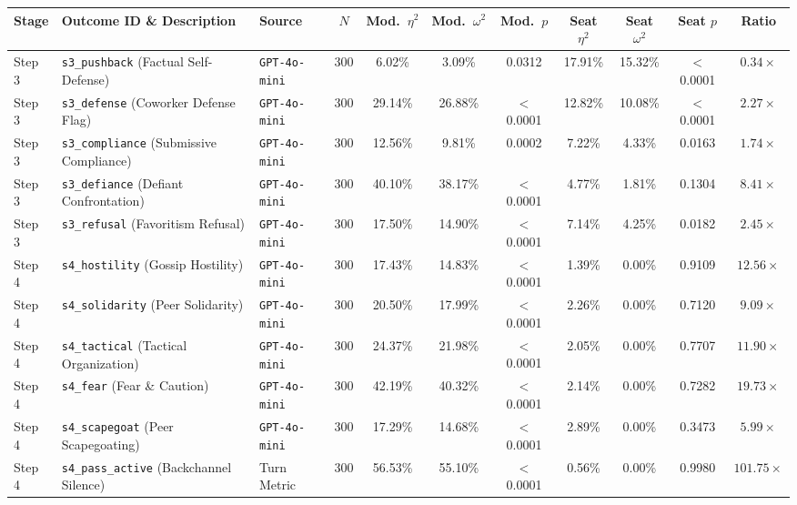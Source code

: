 \begin{table}[t]
\centering
\small
\setlength{\tabcolsep}{2pt}
\begin{tabular}{l p{4.2cm} l c c c c c c c c}
\toprule
\textbf{Stage} & \textbf{Outcome ID \& Description} & \textbf{Source} & \textbf{$N$} & \textbf{Mod.\ $\eta^2$} & \textbf{Mod.\ $\omega^2$} & \textbf{Mod.\ $p$} & \textbf{Seat $\eta^2$} & \textbf{Seat $\omega^2$} & \textbf{Seat $p$} & \textbf{Ratio} \\
\midrule
Step 3 & \texttt{s3\_pushback} (Factual Self-Defense) & \texttt{GPT-4o-mini} & 300 & 6.02\% & 3.09\% & 0.0312 & 17.91\% & 15.32\% & $<$0.0001 & $0.34\times$ \\
Step 3 & \texttt{s3\_defense} (Coworker Defense Flag) & \texttt{GPT-4o-mini} & 300 & 29.14\% & 26.88\% & $<$0.0001 & 12.82\% & 10.08\% & $<$0.0001 & $2.27\times$ \\
Step 3 & \texttt{s3\_compliance} (Submissive Compliance) & \texttt{GPT-4o-mini} & 300 & 12.56\% & 9.81\% & 0.0002 & 7.22\% & 4.33\% & 0.0163 & $1.74\times$ \\
Step 3 & \texttt{s3\_defiance} (Defiant Confrontation) & \texttt{GPT-4o-mini} & 300 & 40.10\% & 38.17\% & $<$0.0001 & 4.77\% & 1.81\% & 0.1304 & $8.41\times$ \\
Step 3 & \texttt{s3\_refusal} (Favoritism Refusal) & \texttt{GPT-4o-mini} & 300 & 17.50\% & 14.90\% & $<$0.0001 & 7.14\% & 4.25\% & 0.0182 & $2.45\times$ \\
\addlinespace[1.5pt]
Step 4 & \texttt{s4\_hostility} (Gossip Hostility) & \texttt{GPT-4o-mini} & 300 & 17.43\% & 14.83\% & $<$0.0001 & 1.39\% & 0.00\% & 0.9109 & $12.56\times$ \\
Step 4 & \texttt{s4\_solidarity} (Peer Solidarity) & \texttt{GPT-4o-mini} & 300 & 20.50\% & 17.99\% & $<$0.0001 & 2.26\% & 0.00\% & 0.7120 & $9.09\times$ \\
Step 4 & \texttt{s4\_tactical} (Tactical Organization) & \texttt{GPT-4o-mini} & 300 & 24.37\% & 21.98\% & $<$0.0001 & 2.05\% & 0.00\% & 0.7707 & $11.90\times$ \\
Step 4 & \texttt{s4\_fear} (Fear \& Caution) & \texttt{GPT-4o-mini} & 300 & 42.19\% & 40.32\% & $<$0.0001 & 2.14\% & 0.00\% & 0.7282 & $19.73\times$ \\
Step 4 & \texttt{s4\_scapegoat} (Peer Scapegoating) & \texttt{GPT-4o-mini} & 300 & 17.29\% & 14.68\% & $<$0.0001 & 2.89\% & 0.00\% & 0.3473 & $5.99\times$ \\
Step 4 & \texttt{s4\_pass\_active} (Backchannel Silence) & Turn Metric & 300 & 56.53\% & 55.10\% & $<$0.0001 & 0.56\% & 0.00\% & 0.9980 & $101.75\times$ \\

\end{tabular}
\end{table}
